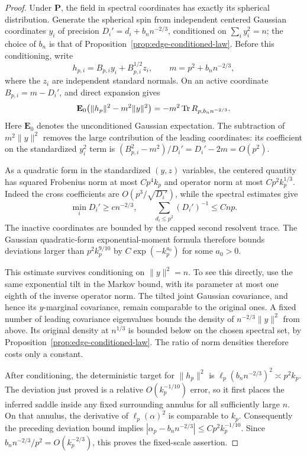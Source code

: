 \begin{proof}
Under $\mathbf P$, the field in spectral coordinates has exactly its
spherical distribution. Generate the spherical spin from independent
centered Gaussian coordinates $y_i$ of precision
$D_i'=d_i+b_n n^{-2/3}$, conditioned on $\sum_i y_i^2=n$; the choice of
$b_n$ is that of Proposition~\ref{prop:edge-conditioned-law}. Before this
conditioning, write
\[
 h_{p,i}=B_{p,i}y_i+B_{p,i}^{1/2}z_i,
 \qquad m=p^2+b_n n^{-2/3},
\]
where the $z_i$ are independent standard normals. On an active coordinate
$B_{p,i}=m-D_i'$, and direct expansion gives
\[
 \mathbf E_0\bigl(\|h_p\|^2-m^2\|y\|^2\bigr)
 =-m^2\operatorname{Tr} R_{p,b_n n^{-2/3}}.
\]
Here $\mathbf E_0$ denotes the unconditioned Gaussian expectation. The
subtraction of $m^2\|y\|^2$ removes the large contribution of the leading
coordinates: its coefficient on the standardized $y_i^2$ term is
$(B_{p,i}^2-m^2)/D_i'=D_i'-2m=O(p^2)$.

As a quadratic form in the standardized $(y,z)$ variables, the centered
quantity has squared Frobenius norm at most $Cp^4k_p$ and operator norm at
most $Cp^2k_p^{1/3}$. Indeed the cross coefficients are
$O(p^3/\sqrt{D_i'})$, while the spectral estimates give
\[
 \min_iD_i'\ge c n^{-2/3},\qquad
 \sum_{d_i\le p^2}(D_i')^{-1}\le Cnp.
\]
The inactive coordinates are bounded by the capped second resolvent trace.
The Gaussian quadratic-form exponential-moment formula therefore bounds
deviations larger than $p^2k_p^{9/10}$ by $C\exp(-k_p^{a_0})$ for some
$a_0>0$.

This estimate survives conditioning on $\|y\|^2=n$. To see this directly,
use the same exponential tilt in the Markov bound, with its parameter at
most one eighth of the inverse operator norm. The tilted joint Gaussian
covariance, and hence its $y$-marginal covariance, remain comparable to
the original ones. A fixed number of leading covariance eigenvalues bounds
the density of $n^{-2/3}\|y\|^2$ from above. Its original density at
$n^{1/3}$ is bounded below on the chosen spectral set, by
Proposition~\ref{prop:edge-conditioned-law}. The ratio of norm densities
therefore costs only a constant.

After conditioning, the deterministic target for $\|h_p\|^2$ is
$\ell_p(b_n n^{-2/3})^2\asymp p^2k_p$. The deviation just proved is a
relative $O(k_p^{-1/10})$ error, so it first places the inferred saddle
inside any fixed surrounding annulus for all sufficiently large $n$.
On that annulus,
the derivative of $\ell_p(\alpha)^2$ is comparable to $k_p$.
Consequently the preceding deviation bound implies
$|\alpha_p-b_n n^{-2/3}|\le Cp^2k_p^{-1/10}$. Since
$b_n n^{-2/3}/p^2=O(k_p^{-2/3})$, this proves the fixed-scale assertion.


\end{proof}
